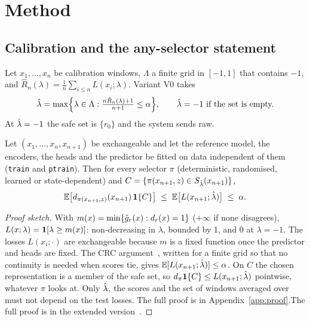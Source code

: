 \section{Method}
\label{sec:method}

\subsection{Calibration and the any-selector statement}

Let $x_1,\dots,x_n$ be calibration windows, $\Lambda$ a finite grid in $[-1,1]$ that contains $-1$,
and $\hat R_n(\lambda) = \frac1n \sum_{i\le n} L(x_i;\lambda)$. Variant V0 takes
\begin{equation}
  \hat\lambda = \max\Bigl\{\lambda \in \Lambda : \tfrac{n \hat R_n(\lambda) + 1}{n+1} \le \alpha\Bigr\},
  \qquad \hat\lambda = -1 \text{ if the set is empty.}
  \label{eq:lhat}
\end{equation}
At $\hat\lambda = -1$ the safe set is $\{r_0\}$ and the system sends raw.

\begin{proposition}
\label{prop:anyselector}
Let $(x_1,\dots,x_n,x_{n+1})$ be exchangeable and let the reference model, the encoders, the heads
and the predictor be fitted on data independent of them (\texttt{train} and \texttt{ptrain}). Then for every selector $\pi$ (deterministic, randomised, learned or
state-dependent) and $C = \{\pi(x_{n+1},z) \in S_{\hat\lambda}(x_{n+1})\}$,
\[
  \mathbb{E}\bigl[d_{\pi(x_{n+1},z)}(x_{n+1})\,\mathbf{1}\{C\}\bigr] \;\le\; \mathbb{E}\bigl[L(x_{n+1};\hat\lambda)\bigr] \;\le\; \alpha .
\]
\end{proposition}

\begin{proof}[Proof sketch]
With $m(x) = \min\{\hat g_r(x) : d_r(x) = 1\}$ ($+\infty$ if none disagrees), $L(x;\lambda) =
\mathbf{1}[\lambda \ge m(x)]$: non-decreasing in $\lambda$, bounded by 1, and $0$ at $\lambda=-1$. The
losses $L(x_i;\cdot)$ are exchangeable because $m$ is a fixed function once the predictor and heads
are fixed. The CRC argument~\cite{angelopoulos2024crc}, written for a finite grid so that no
continuity is needed when scores tie, gives $\mathbb{E}[L(x_{n+1};\hat\lambda)] \le \alpha$. On $C$ the chosen
representation is a member of the safe set, so $d_\pi \mathbf{1}\{C\} \le L(x_{n+1};\hat\lambda)$ pointwise,
whatever $\pi$ looks at. Only $\hat\lambda$, the scores and the set of windows averaged over must not
depend on the test losses.
\ifarxiv The full proof is in Appendix~\ref{app:proof}.\else The full proof is in the extended
version~\cite{kai2026arxiv}.\fi
\end{proof}

